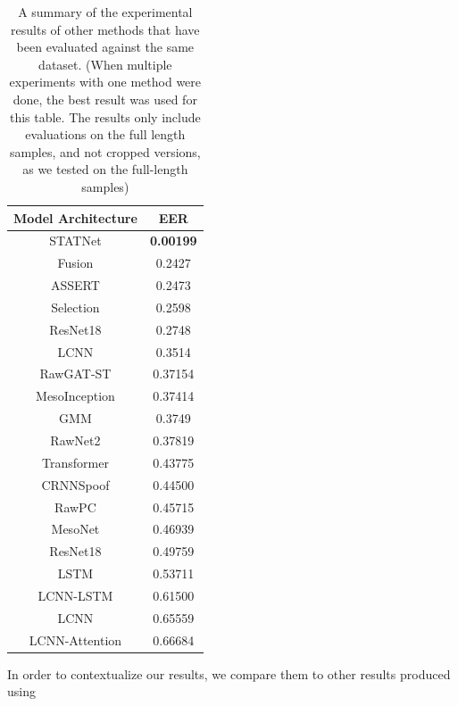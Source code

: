 \documentclass{article}
\begin{document}
			\begin{table}
				\caption{A summary of the experimental results of other methods that have been
				evaluated against the same dataset. (When multiple experiments with one method
				were done, the best result was used for this table. The results only include
				evaluations on the full length samples, and not cropped versions, as we tested on
				the full-length samples)}
				\vspace{10pt}
				\centering
				\begin{tabular}{c | c}
					\hline
					Model Architecture & EER \\
					\hline
					STATNet \cite{ranjan_statnet_2022} & \textbf{0.00199} \\
					Fusion \cite{yang_robust_2024} & 0.2427 \\
					ASSERT \cite{yi_audio_2023} & 0.2473 \\
					Selection \cite{yang_robust_2024} & 0.2598 \\
					ResNet18 \cite{yang_robust_2024} & 0.2748 \\
					LCNN \cite{yi_audio_2023} & 0.3514 \\
					RawGAT-ST \cite{muller_does_2022} & 0.37154 \\
					MesoInception \cite{muller_does_2022} & 0.37414 \\
					GMM \cite{yi_audio_2023} & 0.3749 \\
					RawNet2 \cite{muller_does_2022} & 0.37819 \\
					Transformer \cite{muller_does_2022} & 0.43775 \\
					CRNNSpoof \cite{muller_does_2022} & 0.44500 \\
					RawPC \cite{muller_does_2022} & 0.45715 \\
					MesoNet \cite{muller_does_2022} & 0.46939 \\
					ResNet18 \cite{muller_does_2022} & 0.49759 \\
					LSTM \cite{muller_does_2022} & 0.53711 \\
					LCNN-LSTM \cite{muller_does_2022} & 0.61500 \\
					LCNN \cite{muller_does_2022} & 0.65559 \\
					LCNN-Attention \cite{muller_does_2022} & 0.66684 \\
				\end{tabular}
				\label{table:other_results}
			\end{table}
			In order to contextualize our results, we compare them to other results produced using
\end{document}
